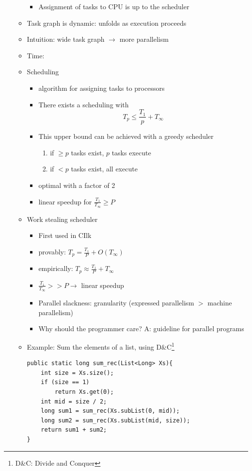 \documentclass[a4paper]{article}
\begin{document}
\begin{itemize}
\begin{itemize}
\begin{itemize}
\item Assignment of tasks to CPU is up to the scheduler
\end{itemize}
\item Task graph is dynamic: unfolds as execution proceeds
\item Intuition: wide task graph $\to$ more parallelism
\item Time:
\item Scheduling
\begin{itemize}
\item algorithm for assigning tasks to processors
\item There exists a scheduling with
\[T_p\leq \frac{T_1}{p}+T_\infty\] 
\item This upper bound can be achieved with a greedy scheduler
\begin{enumerate}
\item if $\geq p$ tasks exist, $p$ tasks execute
\item if $< p$ tasks exist, all execute
\end{enumerate}
\item optimal with a factor of 2
\item linear speedup for $\frac{T_1}{T_\infty}\geq P$
\end{itemize}
\item Work stealing scheduler
\begin{itemize}
\item First used in CIlk
\item provably: $T_p=\frac{T_1}{P}+O\left( T_\infty\right)$
\item empirically: $T_p\approx\frac{T_1}{P}+T_\infty$
\item $\frac{T_1}{T_\infty}>>P\to$ linear speedup
\item Parallel slackness: granularity (expressed parallelism $>$ machine parallelism)
\item Why should the programmer care? A: guideline for parallel programs
\end{itemize}
\item Example: Sum the elements of a list, using D\&C\footnote{D\&C: Divide and Conquer}
\begin{lstlisting}
public static long sum_rec(List<Long> Xs){
    int size = Xs.size();
    if (size == 1)
        return Xs.get(0);
    int mid = size / 2;
    long sum1 = sum_rec(Xs.subList(0, mid)); 
    long sum2 = sum_rec(Xs.subList(mid, size)); 
    return sum1 + sum2;
}
\end{lstlisting}

\end{itemize}
\end{itemize}
\end{document}
